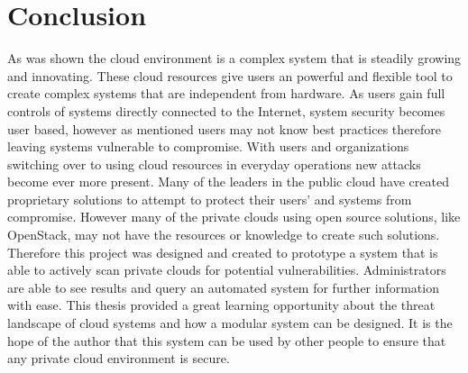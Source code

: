 \documentclass[12pt]{article}
\begin{document}
\section{Conclusion}
As was shown the cloud environment is a complex system that is steadily growing and innovating. These cloud resources give users an powerful and flexible tool to create complex systems that are independent from hardware. As users gain full controls of systems directly connected to the Internet, system security becomes user based, however as mentioned users may not know best practices therefore leaving systems vulnerable to compromise. With users and organizations switching over to using cloud resources in everyday operations new attacks become ever more present. Many of the leaders in the public cloud have created proprietary solutions to attempt to protect their users' and systems from compromise. However many of the private clouds using open source solutions, like OpenStack, may not have the resources or knowledge to create such solutions. Therefore this project was designed and created to prototype a system that is able to actively scan private clouds for potential vulnerabilities. Administrators are able to see results and query an automated system for further information with ease. This thesis provided a great learning opportunity about the threat landscape of cloud systems and how a modular system can be designed. It is the hope of the author that this system can be used by other people to ensure that any private cloud environment is secure.


\newpage


\newpage
\appendix

\end{document}
